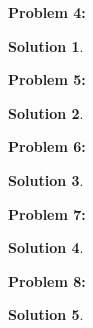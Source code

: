 \documentclass[12pt, letterpaper]{article}
\theoremstyle{nonumberplain}
\newtheorem{sol}{Solution}
\begin{document}
\hspace{18pt}\textbf{Problem 4:} \medskip
\begin{sol}
    
\end{sol}

\hspace{18pt}\textbf{Problem 5:} \medskip
\begin{sol}
    
\end{sol}

\hspace{18pt}\textbf{Problem 6:} \medskip
\begin{sol}
    
\end{sol}

\hspace{18pt}\textbf{Problem 7:} \medskip
\begin{sol}
    
\end{sol}

\hspace{18pt}\textbf{Problem 8:} \medskip
\begin{sol}
    
\end{sol}
\end{document}
